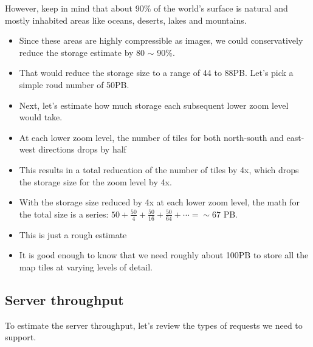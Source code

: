 \documentclass{report}
\theoremstyle{definition}
\let\oldsubsection\subsection
\renewcommand{\subsection}{\oldsubsection*}
\begin{document}
However, keep in mind that about 90\% of the world's surface is natural and mostly inhabited  areas like oceans, deserts, lakes and mountains.

\begin{itemize}
\item
Since these areas are highly compressible as images, we could conservatively reduce the storage estimate by 80 $\sim$ 90\%.
\item
That would reduce the storage size to a range of 44 to 88PB. Let's pick a simple roud number of 50PB.
\item
Next, let's estimate how much storage each subsequent lower zoom level would take.
\item
At each lower zoom level, the number of tiles for both north-south and east-west directions drops by half
\item
This results in a total reducation of the number of tiles by 4x, which drops the storage size for the zoom level by 4x.
\item
With the storage size reduced by 4x at each lower zoom level, the math for the total size is a series: $50 + \frac{50}{4} + \frac{50}{16} + \frac{50}{64} + \cdots =\sim 67$ PB.
\item
This is just a rough estimate
\item
It is good enough to know that we need roughly about 100PB to store all the map tiles at varying levels of detail.
\end{itemize}

\subsection{Server throughput}

To estimate the server throughput, let's review the types of requests we need to support.
\end{document}
